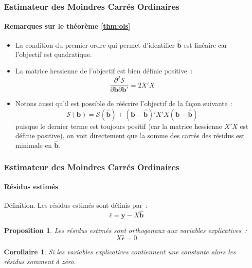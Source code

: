 \documentclass[10pt]{beamer}
\theoremstyle{plain}
\newenvironment{defn}[1]
{\bgroup \small\begin{block}{Définition. #1}}
  {\end{block}\egroup}
\newtheorem{prop}{Proposition}
\newtheorem{cor}{Corollaire}
\begin{document}
\begin{frame}
  \frametitle{Estimateur des Moindres Carrés Ordinaires}
  \framesubtitle{Remarques sur le théorème \ref{thm:ols}}

  \begin{itemize}

  \item La condition du premier ordre qui permet d'identifier $\hat{\mathbf b}$ est linéaire car l'objectif est quadratique.\newline

  \item La matrice hessienne de l'objectif est bien définie positive~:
    \[
      \frac{\partial^2\mathcal S}{\partial \mathbf b \partial\mathbf b'} = 2 X'X
    \]

  \item Notons aussi qu'il est possible de réécrire l'objectif de la façon suivante~:
    \[
      \mathcal S(\mathbf b) = \mathcal S(\hat{\mathbf b}) + \left(\mathbf b - \hat{\mathbf b}  \right)' X'X \left(\mathbf b - \hat{\mathbf b}  \right)
    \]
    puisque le dernier terme est toujours positif (car la matrice hessienne $X'X$ est définie positive), on voit directement que la somme des carrés des résidus est minimale en $\hat{\mathbf b}$.

  \end{itemize}

\end{frame}



\begin{frame}
  \frametitle{Estimateur des Moindres Carrés Ordinaires}
  \framesubtitle{Résidus estimés}

  \begin{defn}{}
    Les résidus estimés sont définis par~:
    \[
      \hat{\epsilon}  = \mathbf y - X \hat{\mathbf b}
    \]
  \end{defn}

  \bigskip

  \begin{prop}\label{prop:orthogonal_residuals}
    Les résidus estimés sont orthogonaux aux variables explicatives~:
    \[
    X\hat\epsilon = 0
  \]
  \end{prop}

  \bigskip

  \begin{cor}\label{cor:zero_mean_residuals}
    Si les variables explicatives contiennent une constante alors les résidus somment à zéro.
  \end{cor}

\end{frame}
\end{document}
